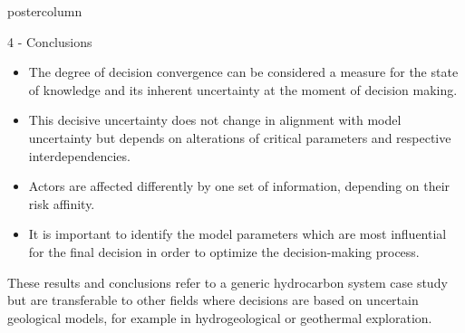 \documentclass{beamer}
\begin{document}
\begin{frame}
\begin{columns}
\begin{column}{.249\textwidth}
\begin{beamercolorbox}[center]{postercolumn}
\begin{minipage}{.98\textwidth}
{\begin{myblock}{4 - Conclusions}
\begin{itemize}
\item The degree of decision convergence can be considered a measure for the state of knowledge and its inherent uncertainty at the moment of decision making.
\item This decisive uncertainty does not change in alignment with model uncertainty but depends on alterations of critical parameters and respective interdependencies.
\item Actors are affected differently by one set of information, depending on their risk affinity.
\item It is important to identify the model parameters which are most influential for the final decision in order to
optimize the decision-making process.
\end{itemize}
These results and conclusions refer to a generic hydrocarbon system case study but are transferable to other fields where decisions
are based on uncertain geological models, for example in hydrogeological or geothermal exploration.

\end{myblock}}
\end{minipage}
\end{beamercolorbox}
\end{column}
\end{columns}
\end{frame}
\end{document}
